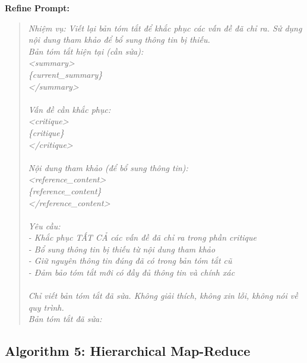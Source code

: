 \documentclass[11pt]{article}
\begin{document}
\textbf{Refine Prompt:}
\begin{quote}
\textit{Nhiệm vụ: Viết lại bản tóm tắt để khắc phục các vấn đề đã chỉ ra. Sử dụng nội dung tham khảo để bổ sung thông tin bị thiếu.\\
Bản tóm tắt hiện tại (cần sửa):\\
<summary>\\
\{current\_summary\}\\
</summary>\\
\\
Vấn đề cần khắc phục:\\
<critique>\\
\{critique\}\\
</critique>\\
\\
Nội dung tham khảo (để bổ sung thông tin):\\
<reference\_content>\\
\{reference\_content\}\\
</reference\_content>\\
\\
Yêu cầu:\\
- Khắc phục TẤT CẢ các vấn đề đã chỉ ra trong phần critique\\
- Bổ sung thông tin bị thiếu từ nội dung tham khảo\\
- Giữ nguyên thông tin đúng đã có trong bản tóm tắt cũ\\
- Đảm bảo tóm tắt mới có đầy đủ thông tin và chính xác\\
\\
Chỉ viết bản tóm tắt đã sửa. Không giải thích, không xin lỗi, không nói về quy trình.\\
Bản tóm tắt đã sửa:}
\end{quote}

\subsection{Algorithm 5: Hierarchical Map-Reduce}
\end{document}
